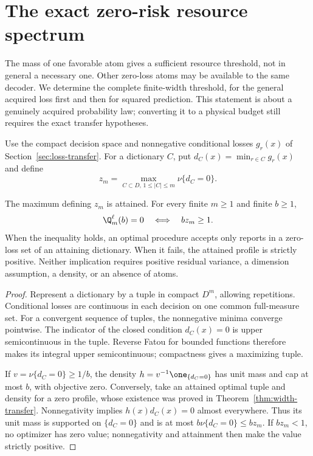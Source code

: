 \section{The exact zero-risk resource spectrum}\label{sec:zero-spectrum}
The mass of one favorable atom gives a sufficient resource threshold, not in general a necessary one. Other zero-loss atoms may be available to the same decoder. We determine the complete finite-width threshold, for the general acquired loss first and then for squared prediction. This statement is about a genuinely acquired probability law; converting it to a physical budget still requires the exact transfer hypotheses.

Use the compact decision space and nonnegative conditional losses $g_r(x)$ of Section~\ref{sec:loss-transfer}. For a dictionary $C$, put $d_C(x)=\min_{r\in C}g_r(x)$ and define
\[
 z_m=\max_{C\subset D,\,1\le |C|\le m}\nu\{d_C=0\}.
\]
\begin{theorem}\label{thm:zero-general}
The maximum defining $z_m$ is attained. For every finite $m\ge1$ and finite $b\ge1$,
\begin{equation}\label{eq:zero-general}
 \Q_m^\ell(b)=0\quad\Longleftrightarrow\quad bz_m\ge1.
\end{equation}
When the inequality holds, an optimal procedure accepts only reports in a zero-loss set of an attaining dictionary. When it fails, the attained profile is strictly positive. Neither implication requires positive residual variance, a dimension assumption, a density, or an absence of atoms.
\end{theorem}
\begin{proof}
Represent a dictionary by a tuple in compact $D^m$, allowing repetitions. Conditional losses are continuous in each decision on one common full-measure set. For a convergent sequence of tuples, the nonnegative minima converge pointwise. The indicator of the closed condition $d_C(x)=0$ is upper semicontinuous in the tuple. Reverse Fatou for bounded functions therefore makes its integral upper semicontinuous; compactness gives a maximizing tuple.

If $v=\nu\{d_C=0\}\ge1/b$, the density $h=v^{-1}\one_{\{d_C=0\}}$ has unit mass and cap at most $b$, with objective zero. Conversely, take an attained optimal tuple and density for a zero profile, whose existence was proved in Theorem~\ref{thm:width-transfer}. Nonnegativity implies $h(x)d_C(x)=0$ almost everywhere. Thus its unit mass is supported on $\{d_C=0\}$ and is at most $b\nu\{d_C=0\}\le bz_m$. If $bz_m<1$, no optimizer has zero value; nonnegativity and attainment then make the value strictly positive.
\end{proof}

